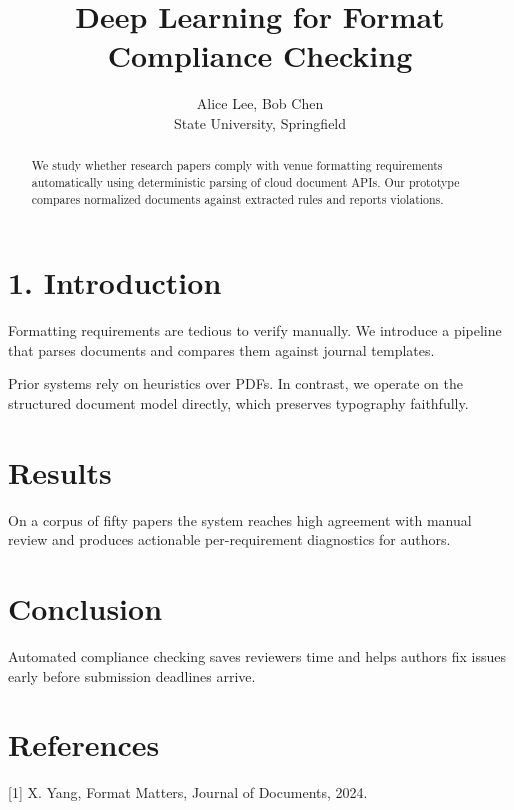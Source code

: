 \documentclass[letterpaper,11pt]{article}
\title{Deep Learning for Format Compliance Checking}
\author{Alice Lee, Bob Chen\\ State University, Springfield}
\date{}
\begin{document}
\maketitle

\begin{abstract}
We study whether research papers comply with venue formatting requirements automatically using deterministic parsing of cloud document APIs. Our prototype compares normalized documents against extracted rules and reports violations.
\end{abstract}

\section{1. Introduction}
Formatting requirements are tedious to verify manually. We introduce a pipeline that parses documents and compares them against journal templates.

Prior systems rely on heuristics over PDFs. In contrast, we operate on the structured document model directly, which preserves typography faithfully.

\section{Results}
On a corpus of fifty papers the system reaches high agreement with manual review and produces actionable per-requirement diagnostics for authors.

\section{Conclusion}
Automated compliance checking saves reviewers time and helps authors fix issues early before submission deadlines arrive.

\section{References}
[1] X. Yang, Format Matters, Journal of Documents, 2024.
\end{document}
